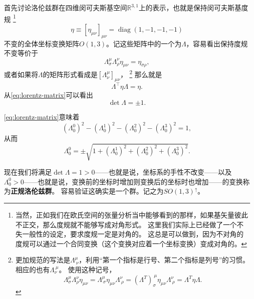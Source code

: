 \documentclass[hyperref, UTF8, a4paper]{ctexart}
\DeclareMathOperator{\diag}{diag}
\newcommand*{\reals}{\mathbb{R}}
\begin{document}
首先讨论洛伦兹群在四维闵可夫斯基空间$\reals^{3, 1}$上的表示，也就是保持闵可夫斯基度规%
\footnote{当然，正如我们在欧氏空间的张量分析当中能够看到的那样，如果基矢量彼此不正交，那么度规就不能够写成对角形式。
这里我们实际上已经做了一个不失一般性的设定，要求度规一定是对角的。
这总是可以做到，因为不对角的度规可以通过一个合同变换（这个变换对应着一个坐标变换）变成对角的。}%
\begin{equation}
    \eta \equiv [\eta_{\mu \nu}]_{\mu \nu} = \diag (1, -1, -1, -1)
\end{equation}
不变的全体坐标变换矩阵$O(1,3)$。记这些矩阵中的一个为$\Lambda$，容易看出保持度规不变等价于
\begin{equation}
    \Lambda_\sigma^\mu \Lambda_\rho^\nu \eta_{\mu \nu} = \eta_{\sigma \rho},
\end{equation}
或者如果将$\Lambda$的矩阵形式看成是$[\Lambda^\mu_\nu]_{\mu \nu}$，%
\footnote{更加规范的写法是$\Lambda^\mu_{\ \nu}$，利用“第一个指标是行号、第二个指标是列号”的习惯。相应的也有$\Lambda_{\nu}^{\ \mu}$。
使用这种记号，
\[
    \Lambda_\sigma^\mu \Lambda_\rho^\nu \eta_{\mu \nu} = \Lambda_{\ \sigma}^\mu \eta_{\mu \nu} \Lambda_{\ \rho}^\nu = (\Lambda^T)_\sigma^{\ \mu} \eta_{\mu \nu} \Lambda_{\ \rho}^\nu = \Lambda^T \eta \Lambda.
\]
}%
那么就是
\begin{equation}
    \Lambda^\top \eta \Lambda = \eta.
    \label{eq:lorentz-matrix}
\end{equation}
从\eqref{eq:lorentz-matrix}可以看出
\begin{equation}
    \det \Lambda = \pm 1. 
    \label{eq:det-lorentz}
\end{equation}

\eqref{eq:lorentz-matrix}意味着
\[
    (\Lambda_0^0)^2 - (\Lambda_0^1)^2 - (\Lambda_0^2)^2 - (\Lambda_0^3)^2 = 1,
\]
从而
\begin{equation}
    \Lambda_0^0 = \pm \sqrt{1 + (\Lambda_0^1)^2 + (\Lambda_0^2)^2 + (\Lambda_0^3)^2}.
\end{equation}

现在我们将满足$\det \Lambda = 1 > 0$——也就是说，坐标系的手性不改变——以及$\Lambda_0^0 > 0$——也就是说，变换前的坐标时增加则变换后的坐标时也增加——的变换称为\textbf{正规洛伦兹群}。
容易验证这确实是一个群。记之为$SO(1,3)^\uparrow$。
\end{document}

